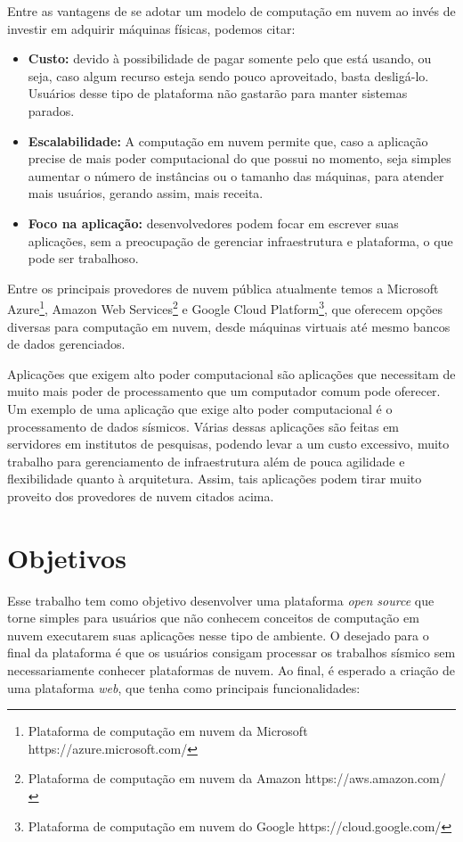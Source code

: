 \documentclass[11pt,twoside]{article}
\begin{document}
Entre as vantagens de se adotar um modelo de computação em nuvem ao invés de investir em adquirir máquinas físicas, podemos citar:

\begin{itemize}
  \item \textbf{Custo:} devido à possibilidade de pagar somente pelo que está usando, ou seja, caso algum recurso esteja sendo pouco aproveitado, basta desligá-lo. Usuários desse tipo de 
  plataforma não gastarão para manter sistemas parados.
  \item \textbf{Escalabilidade:} A computação em nuvem permite que, caso a aplicação precise de mais poder computacional do que possui no momento, seja simples aumentar
  o número de instâncias ou o tamanho das máquinas, para atender mais usuários, gerando assim, mais receita.
  \item \textbf{Foco na aplicação:} desenvolvedores podem focar em escrever suas 
  aplicações, sem a preocupação de gerenciar infraestrutura e plataforma, o que pode ser trabalhoso.

\end{itemize}

Entre os principais provedores de nuvem pública atualmente temos a Microsoft Azure\footnote{Plataforma de computação em nuvem da Microsoft https://azure.microsoft.com/}, 
Amazon Web Services\footnote{Plataforma de computação em nuvem da Amazon https://aws.amazon.com/} e Google Cloud Platform\footnote{Plataforma de computação em nuvem do Google https://cloud.google.com/}, 
que oferecem opções diversas para computação em nuvem, desde máquinas virtuais até mesmo bancos de dados gerenciados.

Aplicações que exigem alto poder computacional são aplicações que necessitam de muito mais poder de processamento que um computador comum pode oferecer. 
Um exemplo de uma aplicação que exige alto poder computacional é o processamento de dados sísmicos.
Várias dessas aplicações são feitas em servidores em institutos de pesquisas, podendo levar
a um custo excessivo, muito trabalho para gerenciamento de infraestrutura além de pouca agilidade e flexibilidade quanto à arquitetura. Assim, tais aplicações podem 
tirar muito proveito dos provedores de nuvem citados acima.

\section{Objetivos}
Esse trabalho tem como objetivo desenvolver uma plataforma \emph{open source} que torne simples para usuários que não conhecem conceitos de computação em nuvem 
executarem suas aplicações nesse tipo de ambiente. 
O desejado para o final da plataforma é que os usuários consigam processar 
os trabalhos sísmico sem necessariamente conhecer plataformas de nuvem.  
Ao final, é esperado a criação de uma plataforma \emph{web}, que tenha como principais funcionalidades:
\end{document}
